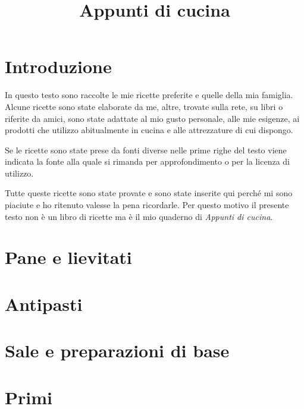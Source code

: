 \documentclass{report}
\makeatletter
\newif\if@mainmatter \@mainmattertrue
\newcommand\frontmatter{%
    \cleardoublepage
  \@mainmatterfalse
  \pagenumbering{roman}}
\newcommand\mainmatter{%
    \cleardoublepage
  \@mainmattertrue
  \pagenumbering{arabic}}
\makeatother
\begin{document}
\title{Appunti di cucina}

\maketitle
\frontmatter
\tableofcontents

\mainmatter
\chapter*{Introduzione}

In questo testo sono raccolte le mie ricette preferite e quelle della mia famiglia. Alcune ricette sono state elaborate da me, altre, trovate sulla rete, su libri o riferite da amici, sono state adattate al mio gusto personale, alle mie esigenze, ai prodotti che utilizzo abitualmente in cucina e alle attrezzature di cui dispongo.

Se le ricette sono state prese da fonti diverse nelle prime righe del testo viene indicata la fonte alla quale si rimanda per approfondimento o per la licenza di utilizzo.

Tutte queste ricette sono state provate e sono state inserite qui perché mi sono piaciute e ho ritenuto valesse la pena ricordarle. Per questo motivo il presente testo non è un libro di ricette ma è il mio quaderno di \emph{Appunti di cucina}.



\newpage
\chapter{Pane e lievitati}



\newpage
\chapter{Antipasti}


\newpage
\chapter{Sale e preparazioni di base}






\newpage
\chapter{Primi}

\end{document}
